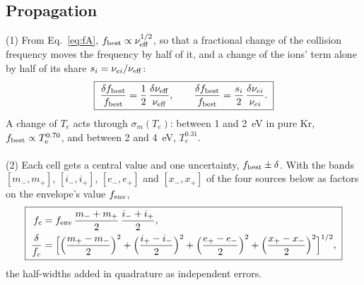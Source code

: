 \documentclass[11pt]{article}
\numberwithin{equation}{section}
\newcommand{\nueff}{\nu_{\rm eff}}
\newcommand{\nuei}{\nu_{ei}}
\newcommand{\fbest}{f_{\rm best}}
\newcommand{\Te}{T_e}
\begin{document}
\subsection{Propagation}
\label{sec:propagation}
{\noindent}(1) From Eq.~\eqref{eq:fA}, $\fbest\propto\nueff^{1/2}$, so that a fractional
change of the collision frequency moves the frequency by half of it, and a change of the
ions' term alone by half of its share $s_i=\nuei/\nueff$:
\begin{equation}
\boxed{\;\frac{\delta\fbest}{\fbest}=\frac12\,\frac{\delta\nueff}{\nueff},\qquad
\frac{\delta\fbest}{\fbest}=\frac{s_i}{2}\,\frac{\delta\nuei}{\nuei}.\;}
\label{eq:propagation}
\end{equation}
A change of $\Te$ acts through $\sigma_m(\Te)$: between 1 and 2~eV in pure Kr,
$\fbest\propto\Te^{0.70}$, and between 2 and 4~eV, $\Te^{0.31}$.
\\ \\
{\noindent}(2) Each cell gets a central value and one uncertainty, $\fbest\pm\delta$. With
the bands $[m_-,m_+]$, $[i_-,i_+]$, $[e_-,e_+]$ and $[x_-,x_+]$ of the four sources below
as factors on the envelope's value $f_{\rm env}$,
\begin{equation}
\boxed{\;\begin{aligned}
f_c&=f_{\rm env}\,\frac{m_-+m_+}{2}\,\frac{i_-+i_+}{2},\\
\frac{\delta}{f_c}&=\Big[\Big(\frac{m_+-m_-}{2}\Big)^2+\Big(\frac{i_+-i_-}{2}\Big)^2
+\Big(\frac{e_+-e_-}{2}\Big)^2+\Big(\frac{x_+-x_-}{2}\Big)^2\Big]^{1/2},
\end{aligned}\;}
\label{eq:delta}
\end{equation}
the half-widths added in quadrature as independent errors.
\end{document}
